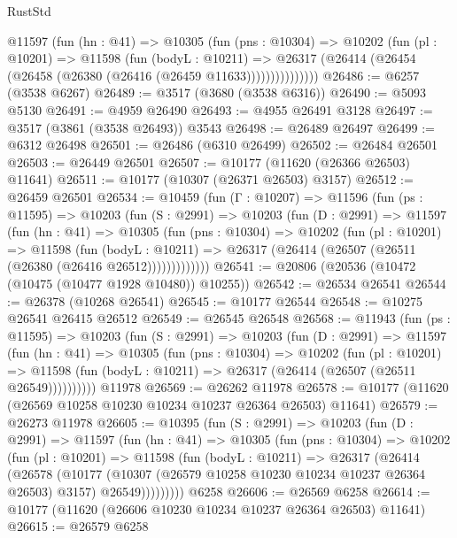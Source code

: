 \begin{lexlean}{RustStd}
\begin{coremodule}
            @11597
              (fun (hn : @41) =>
              @10305
                (fun (pns : @10304) =>
                @10202
                  (fun (pl : @10201) =>
                  @11598
                    (fun (bodyL : @10211) =>
                    @26317 (@26414 (@26454 (@26458 (@26380 (@26416 (@26459 @11633)))))))))))))))
@26486 := @6257 (@3538 @6267)
@26489 := @3517 (@3680 (@3538 @6316))
@26490 := @5093 @5130
@26491 := @4959 @26490
@26493 := @4955 @26491 @3128
@26497 := @3517 (@3861 (@3538 @26493)) @3543
@26498 := @26489 @26497
@26499 := @6312 @26498
@26501 := @26486 (@6310 @26499)
@26502 := @26484 @26501
@26503 := @26449 @26501
@26507 := @10177 (@11620 (@26366 @26503) @11641)
@26511 := @10177 (@10307 (@26371 @26503) @3157)
@26512 := @26459 @26501
@26534 := @10459
    (fun (Γ : @10207) =>
    @11596
      (fun (ps : @11595) =>
      @10203
        (fun (S : @2991) =>
        @10203
          (fun (D : @2991) =>
          @11597
            (fun (hn : @41) =>
            @10305
              (fun (pns : @10304) =>
              @10202
                (fun (pl : @10201) =>
                @11598
                  (fun (bodyL : @10211) =>
                  @26317 (@26414 (@26507 (@26511 (@26380 (@26416 @26512)))))))))))))
@26541 := @20806 (@20536 (@10472 (@10475 (@10477 @1928 @10480)) @10255))
@26542 := @26534 @26541
@26544 := @26378 (@10268 @26541)
@26545 := @10177 @26544
@26548 := @10275 @26541 @26415 @26512
@26549 := @26545 @26548
@26568 := @11943
    (fun (ps : @11595) =>
    @10203
      (fun (S : @2991) =>
      @10203
        (fun (D : @2991) =>
        @11597
          (fun (hn : @41) =>
          @10305
            (fun (pns : @10304) =>
            @10202
              (fun (pl : @10201) =>
              @11598 (fun (bodyL : @10211) => @26317 (@26414 (@26507 (@26511 @26549))))))))))
    @11978
@26569 := @26262 @11978
@26578 := @10177 (@11620 (@26569 @10258 @10230 @10234 @10237 @26364 @26503) @11641)
@26579 := @26273 @11978
@26605 := @10395
    (fun (S : @2991) =>
    @10203
      (fun (D : @2991) =>
      @11597
        (fun (hn : @41) =>
        @10305
          (fun (pns : @10304) =>
          @10202
            (fun (pl : @10201) =>
            @11598
              (fun (bodyL : @10211) =>
              @26317
                (@26414
                  (@26578
                    (@10177
                      (@10307 (@26579 @10258 @10230 @10234 @10237 @26364 @26503) @3157)
                      @26549)))))))))
    @6258
@26606 := @26569 @6258
@26614 := @10177 (@11620 (@26606 @10230 @10234 @10237 @26364 @26503) @11641)
@26615 := @26579 @6258

\end{coremodule}
\end{lexlean}
